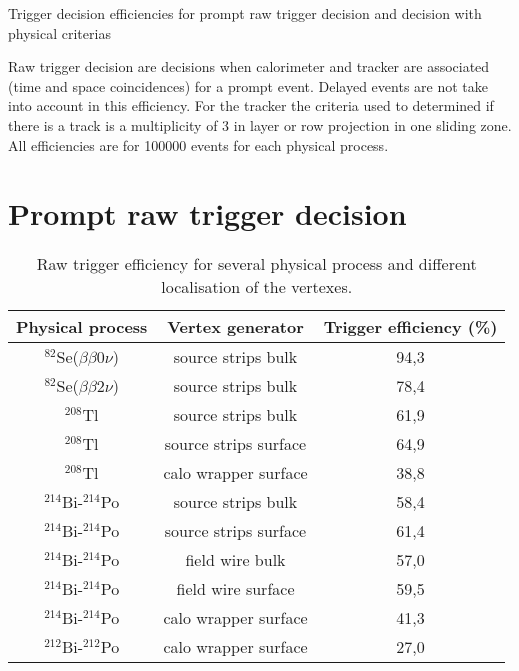 \documentclass[12pt,a4paper]{article}
\newcommand{\BBZN}{$\beta\beta{}0\nu$}
\newcommand{\BBDN}{$\beta\beta{}2\nu$}
\newcommand{\SE}{$^{82}$Se}
\newcommand{\TL}{$^{208}$Tl}
\newcommand{\BIQ}{$^{214}$Bi}
\newcommand{\BID}{$^{212}$Bi}
\newcommand{\POQ}{$^{214}$Po}
\newcommand{\POD}{$^{212}$Po}
\begin{document}
\begin{center}
 \huge{Trigger decision efficiencies for prompt raw trigger decision and decision with physical criterias}
\end{center}

Raw trigger decision are decisions when calorimeter and tracker are associated (time and space coincidences) for a prompt event. Delayed events are not take into account in this efficiency.
For the tracker the criteria used to determined if there is a track is a multiplicity of 3 in layer or row projection in one sliding zone. All efficiencies are for 100000 events for each physical process.

\section{Prompt raw trigger decision}
\begin{table}[!h]
 \begin{center}
  \begin{tabular}{|c||c|c|}
    \hline
    Physical process   & Vertex generator      & Trigger efficiency (\%)  \\
    \hline
    \SE(\BBZN)         & source strips bulk    & 94,3 \\
    \SE(\BBDN)         & source strips bulk    & 78,4 \\
    \TL                & source strips bulk    & 61,9 \\
    \TL                & source strips surface & 64,9 \\
    \TL                & calo wrapper surface  & 38,8 \\
    \BIQ-\POQ          & source strips bulk    & 58,4 \\
    \BIQ-\POQ          & source strips surface & 61,4 \\
    \BIQ-\POQ          & field wire bulk       & 57,0 \\
    \BIQ-\POQ          & field wire surface    & 59,5 \\
    \BIQ-\POQ          & calo wrapper surface  & 41,3 \\
    \BID-\POD          & calo wrapper surface  & 27,0 \\
    \hline
  \end{tabular}
  \end{center}
  \caption{Raw trigger efficiency for several physical process and different localisation of the vertexes.}
\label{raw_efficacity_trigger}
\end{table}
\end{document}
